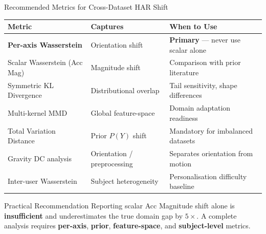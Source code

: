 \documentclass[aspectratio=169, 10pt]{beamer}
\begin{document}
\begin{frame}{Recommended Metrics for Cross-Dataset HAR Shift}
  \begin{center}
  \footnotesize
  \begin{tabularx}{0.93\textwidth}{llX}
    \toprule
    \textbf{Metric} & \textbf{Captures} & \textbf{When to Use} \\
    \midrule
    \textbf{Per-axis Wasserstein} & Orientation shift & \textbf{Primary} — never use scalar alone \\
    Scalar Wasserstein (Acc Mag)  & Magnitude shift   & Comparison with prior literature \\
    Symmetric KL Divergence       & Distributional overlap & Tail sensitivity, shape differences \\
    Multi-kernel MMD              & Global feature-space & Domain adaptation readiness \\
    Total Variation Distance      & Prior $P(Y)$ shift & Mandatory for imbalanced datasets \\
    Gravity DC analysis           & Orientation / preprocessing & Separates orientation from motion \\
    Inter-user Wasserstein        & Subject heterogeneity & Personalisation difficulty baseline \\
    \bottomrule
  \end{tabularx}
  \end{center}

  \vspace{1mm}
  \begin{alertblock}{Practical Recommendation}
    \small Reporting scalar Acc Magnitude shift alone is \textbf{insufficient} and underestimates the true domain gap by $5\times$.
    A complete analysis requires \textbf{per-axis}, \textbf{prior}, \textbf{feature-space}, and \textbf{subject-level} metrics.
  \end{alertblock}
\end{frame}
\end{document}
